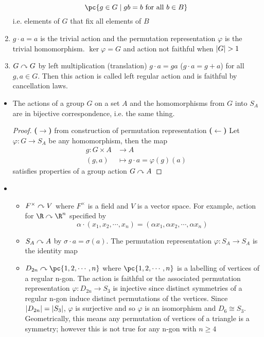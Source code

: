 \documentclass[11pt]{article}
\begin{document}
\begin{definition*}
\begin{enumerate}
        \[
            \pc{
                g\in G \mid gb = b \text{ for all }b\in B
            }
        \]
        i.e. elements of $G$ that fix all elements of $B$
        \item {} $g\cdot a=a$ is the trivial action and the permutation representation $\varphi$ is the trivial homomorphism. $\ker{\varphi} = G$ and action not faithful when $\order{G}>1$
        \item {} $G\curvearrowright G$ by left multiplication (translation) $g \cdot a = ga$ ($g\cdot a = g + a$) for all $g,a\in G$. Then this action is called left regular action and is faithful by cancellation laws.
    \end{enumerate}
    \begin{itemize}
        \item {} The actions of a group $G$ on a set $A$ and the homomorphisms from $G$ into $S_A$ are in bijective correspondence, i.e. the same thing. 
        \begin{proof}
            \textbf{($\rightarrow$)} from construction of permutation representation \textbf{($\leftarrow$)} Let $\varphi:G\to S_A$ be any homomorphism, then the map 
            \begin{align*}
                g: G\times A &\to A \\ 
                        (g,a)&\mapsto g\cdot a = \varphi(g)(a)
            \end{align*}
            satisfies properties of a group action $G\curvearrowright A$
        \end{proof}
        \item {}
        \begin{itemize}
            \item $F^{\times} \curvearrowright V$ where $F^{\times}$ is a field and $V$ is a vector space. For example, action for $\R \actson \R^n$ specified by 
            \[
                \alpha \cdot (x_1, x_2,\cdots,x_n)
                = (\alpha x_1, \alpha x_2, \cdots, \alpha x_n)    
            \]
            \item $S_A \curvearrowright A$ by $\sigma\cdot a = \sigma(a)$. The permutation representation $\varphi: S_A\to S_A$ is the identity map
            \item $D_{2n} \actson \pc{1,2,\cdots,n}$ where $\pc{1,2,\cdots,n}$ is a labelling of vertices of a regular n-gon. The action is faithful or the associated permutation representation $\varphi:D_{2n}\to S_3$ is injective since distinct symmetries of a regular n-gon induce distinct permutations of the vertices. Since $\left|D_{2n}\right| = \left|S_3\right|$, $\varphi$ is surjective and so $\varphi$ is an isomorphism and $D_6 \cong S_3$. Geometrically, this means any permutation of vertices of a triangle is a symmetry; however this is not true for any n-gon with $n\geq 4$
        \end{itemize}
    \end{itemize}
\end{definition*}
\end{document}
